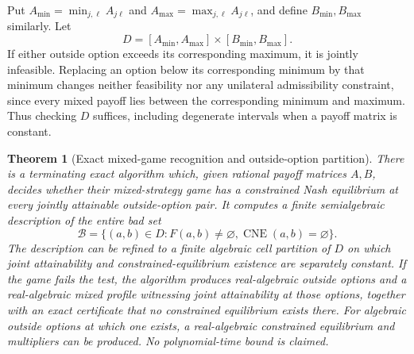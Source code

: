 \documentclass[11pt]{article}
\newtheorem{theorem}{Theorem}
\theoremstyle{definition}
\theoremstyle{remark}
\begin{document}
Put $A_{\min}=\min_{j,\ell}A_{j\ell}$ and $A_{\max}=\max_{j,\ell}A_{j\ell}$,
and define $B_{\min},B_{\max}$ similarly. Let
\[
 D=[A_{\min},A_{\max}]\times[B_{\min},B_{\max}].
\]
If either outside option exceeds its corresponding maximum, it is jointly
infeasible. Replacing an option below its corresponding minimum by that
minimum changes neither feasibility nor any unilateral admissibility
constraint, since every mixed payoff lies between the corresponding
minimum and maximum. Thus checking $D$ suffices, including degenerate
intervals when a payoff matrix is constant.

\begin{theorem}[Exact mixed-game recognition and outside-option partition]
\label{thm:mixed-recognition}
There is a terminating exact algorithm which, given rational payoff
matrices $A,B$, decides whether their mixed-strategy game has a constrained
Nash equilibrium at every jointly attainable outside-option pair. It
computes a finite semialgebraic description of the entire bad set
\[
 \mathcal B=\{(a,b)\in D:F(a,b)\ne\varnothing,
                          \operatorname{CNE}(a,b)=\varnothing\}. \tag{3}
\]
The description can be refined to a finite algebraic cell partition of $D$
on which joint attainability and constrained-equilibrium existence are
separately constant. If the game fails the test, the algorithm produces
real-algebraic outside options and a real-algebraic mixed profile witnessing
joint attainability at those options, together with an exact certificate
that no constrained equilibrium exists there. For algebraic outside
options at which one exists, a real-algebraic constrained equilibrium and
multipliers can be produced. No polynomial-time bound is claimed.
\end{theorem}
\end{document}
